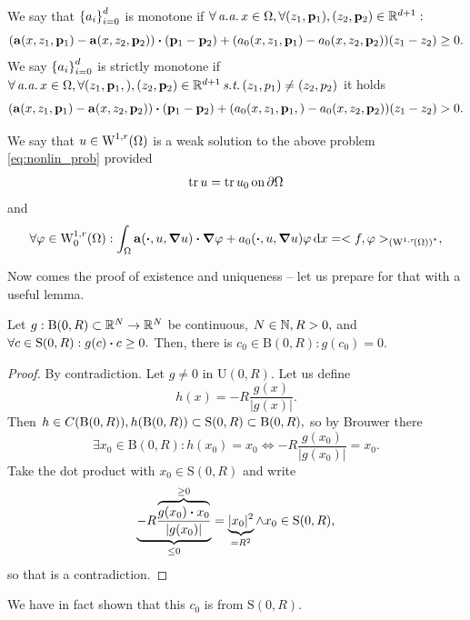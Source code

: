 \documentclass{article}
\begin{document}
\begin{definition}[Monotonicity]
	We say that $\qty{a_i}_{i=0}^d$ is monotone if $\forall \, \text{\textit{a.a.}} \, x \in \Omega, \forall \qty(z_1, \vb{p}_1), \qty(z_2, \vb{p}_2) \in {\mathbb R}^{d+1}:$
	\[
		\qty(\vb{a}\qty(x,z_1,\vb{p}_1)-\vb{a}\qty(x,z_2,\vb{p}_2))\vdot (\vb{p}_1 - \vb{p}_2) + (a_0\qty(x,z_1,\vb{p}_1)-a_0\qty(x,z_2,\vb{p}_2))(z_1 - z_2) \geq 0.
	\]
	We say $\qty{a_i}_{i=0}^d$ is strictly monotone if $\forall \, \text{\textit{a.a.}} \,x \in \Omega, \forall \qty(z_1, \vb{p}_1,), \qty(z_2, \vb{p}_2) \in {\mathbb R}^{d+1} \, \text{\textit{s.t.}} \, \qty(z_1,p_1) \neq \qty(z_2, p_2)$ it holds 
	\[
		\qty(\vb{a}\qty(x,z_1, \vb{p}_1) - \vb{a}\qty(x, z_2, \vb{p}_2)) \vdot \qty(\vb{p}_1 - \vb{p}_2) + \qty(a_0\qty(x,z_1, \vb{p}_1,)-a_0\qty(x,z_2, \vb{p}_2))\qty(z_1 - z_2) > 0.
	\]
\end{definition}

\begin{definition}
	We say that $u \in \WkpSet[1][r]{\Omega}$ is a weak solution to the above problem \ref{eq:nonlin_prob} provided
	\[
		\trace u = \trace u_0 \, \text{on} \, \partial \Omega
	\]
	and 
	\[
		\forall \varphi \in \WkpzeroSet[1][r]{\Omega}: \int_{\Omega}\vb{a}\qty(\vdot, u, \grad u)\vdot \grad \varphi +a_0\qty(\vdot, u, \grad u) \varphi \dd{x} = <f,\varphi>_{\qty(\WkpSet[1][r]{\Omega})^{*}}, 
	\]
\end{definition}

Now comes the proof of existence and uniqueness -- let us prepare for that with a useful lemma.

\begin{lemma}
	Let $g: \text{B}(0,R) \subset {\mathbb R}^N \to {\mathbb R}^N$ be continuous, $N \in {\mathbb N}, R>0,$ and $\forall c \in \text{S}(0,R): g(c) \vdot c \geq 0.$ Then, there is $c_0 \in \text{B}(0,R): g(c_0) = 0.$
	\begin{proof}
		By contradiction. Let $g \neq 0$ in $\text{U}(0,R)$. Let us define
		\[
			h(x) = -R\frac{g(x)}{|g(x)|}.
		\]
		Then $h \in C\qty(\text{B}(0,R)), h\qty(\text{B}(0,R)) \subset \text{S}(0,R)\subset \text{B}(0,R),$ so by Brouwer there
		\[
			\exists x_0 \in \text{B}(0,R): h(x_0) = x_0 \Leftrightarrow -R \frac{g(x_0)}{|g(x_0)|} = x_0.
		\]
		Take the dot product with $x_0 \in \text{S}(0,R)$ and write
		\[
			\underbrace{-R \frac{\overbrace{g(x_0) \vdot x_0}^{\geq 0}}{|g(x_0)|}}_{\leq 0} = \underbrace{|x_0|^{2}}_{ = R^{2}} \wedge x_0 \in \text{S}(0,R),
		\]
		so that is a contradiction.
	\end{proof}
\end{lemma}
\begin{remark}
    We have in fact shown that this $c_0$ is from $\text{S}(0,R).$
\end{remark}
\end{document}
